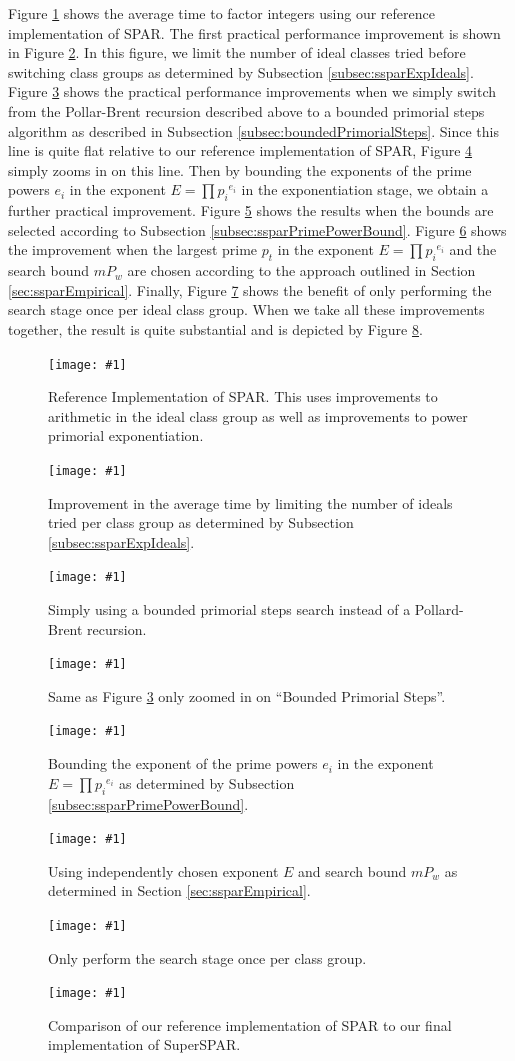 \documentclass{ucalgthes1}
\theoremstyle{definition}
\newcommand{\mygraphX}[4]{
	\begin{figure}[htb]
	\centering
	\texttt{[image: \#1]}
	\caption[#4]{#3}
	\label{#2}
	\end{figure}
}
\begin{document}
Figure \ref{fig:sparEvolve1} shows the average time to factor integers using our reference implementation of SPAR.  The first practical performance improvement is shown in Figure \ref{fig:sparEvolve2}.  In this figure, we limit the number of ideal classes tried before switching class groups as determined by Subsection \ref{subsec:ssparExpIdeals}.  Figure \ref{fig:sparEvolve3} shows the practical performance improvements when we simply switch from the Pollar-Brent recursion described above to a bounded primorial steps algorithm as described in Subsection \ref{subsec:boundedPrimorialSteps}.  Since this line is quite flat relative to our reference implementation of SPAR, Figure \ref{fig:sparEvolve4} simply zooms in on this line.  Then by bounding the exponents of the prime powers $e_i$ in the exponent $E = \prod {p_i}^{e_i}$ in the exponentiation stage, we obtain a further practical improvement.  Figure \ref{fig:sparEvolve5} shows the results when the bounds are selected according to Subsection \ref{subsec:ssparPrimePowerBound}.  Figure \ref{fig:sparEvolve6} shows the improvement when the largest prime $p_t$ in the exponent $E = \prod {p_i}^{e_i}$ and the search bound $mP_w$ are chosen according to the approach outlined in Section \ref{sec:ssparEmpirical}.  Finally, Figure \ref{fig:sparEvolve7} shows the benefit of only performing the search stage once per ideal class group.   When we take all these improvements together, the result is quite substantial and is depicted by Figure \ref{fig:sparEvolve8}.

\mygraphX{spar-vanilla}{fig:sparEvolve1}{Reference Implementation of SPAR. This uses improvements to arithmetic in the ideal class group as well as improvements to power primorial exponentiation.}{Reference SPAR}
\mygraphX{spar-bound-attempts}{fig:sparEvolve2}{Improvement in the average time by limiting the number of ideals tried per class group as determined by Subsection \ref{subsec:ssparExpIdeals}.}{Bound the Number of Ideals per Group}
\mygraphX{spar-to-sspar}{fig:sparEvolve3}{Simply using a bounded primorial steps search instead of a Pollard-Brent recursion.}{Bounded Primorial Steps Search}
\mygraphX{sspar-theoretical}{fig:sparEvolve4}{Same as Figure \ref{fig:sparEvolve3} only zoomed in on ``Bounded Primorial Steps''.}{Bounded Primorial Steps Search (Zoomed)}
\mygraphX{sspar-power-bound}{fig:sparEvolve5}{Bounding the exponent of the prime powers $e_i$ in the exponent $E = \prod {p_i}^{e_i}$ as determined by Subsection \ref{subsec:ssparPrimePowerBound}.}{Bound $e_i$ in Exponent $E = \prod {p_i}^{e_i}$}
\mygraphX{sspar-noreuse}{fig:sparEvolve6}{Using independently chosen exponent $E$ and search bound $mP_w$ as determined in Section \ref{sec:ssparEmpirical}.}{Independent Exponent $E$ and Search Bound $mP_w$}
\mygraphX{sspar-optimized}{fig:sparEvolve7}{Only perform the search stage once per class group.}{Perform a Single Search}
\mygraphX{spar-vs-sspar}{fig:sparEvolve8}{Comparison of our reference implementation of SPAR to our final implementation of SuperSPAR.}{SPAR vs SuperSPAR}
\end{document}
